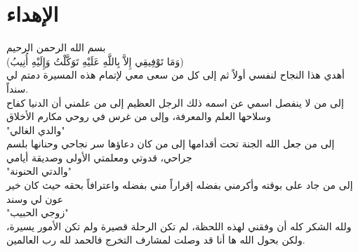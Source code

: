 \chapter*{الإهداء}
\begin{center}
	\amirifont
	بسم الله الرحمن الرحيم \\[10pt]
	(‏وَمَا تَوْفِيقِي إِلاَّ بِاللَّهِ عَلَيْهِ تَوَكَّلْتُ وَإِلَيْهِ أُنِيبُ) \\[10pt]
	أهدي هذا النجاح لنفسي أولاً ثم إلى كل من سعى معي لإتمام هذه المسيرة دمتم لي سنداً. \\[10pt]
	إلى من لا ينفصل اسمي عن اسمه ذلك الرجل العظيم إلى من علمني أن الدنيا كفاح وسلاحها العلم والمعرفة، وإلى من غرس في روحي مكارم الأخلاق \\
	"والدي الغالي" \\[10pt]
	إلى من جعل الله الجنة تحت أقدامها إلى من كان دعاؤها سر نجاحي وحنانها بلسم جراحي، قدوتي ومعلمتي الأولى وصديقة أيامي \\
	"والدتي الحنونة" \\[10pt]
	إلى من جاد على بوقته وأكرمني بفضله إقراراً مني بفضله واعترافاً بحقه حيث كان خير عون لي وسند \\
	"زوجي الحبيب" \\[10pt]
	ولله الشكر كله أن وفقني لهذه اللحظة، لم تكن الرحلة قصيرة ولم تكن الأمور يسيرة، ولكن بحول الله ها أنا قد وصلت لمشارف التخرج فالحمد لله رب العالمين.
\end{center}